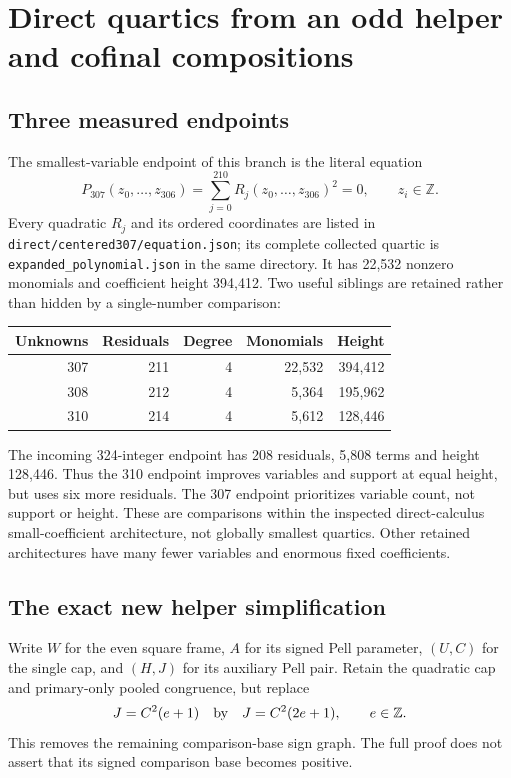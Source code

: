 \section{Direct quartics from an odd helper and cofinal compositions}
\label{sec:round17-direct}

\subsection{Three measured endpoints}
The smallest-variable endpoint of this branch is the literal equation
\[
 P_{307}(z_0,\ldots,z_{306})
   =\sum_{j=0}^{210}R_j(z_0,\ldots,z_{306})^2=0,
 \qquad z_i\in\mathbb Z.
\]
Every quadratic $R_j$ and its ordered coordinates are listed in
\texttt{direct/centered307/equation.json}; its complete collected quartic is
\texttt{expanded\_polynomial.json} in the same directory. It has 22,532
nonzero monomials and coefficient height 394,412. Two useful siblings are
retained rather than hidden by a single-number comparison:
\begin{center}
\begin{tabular}{rrrrr}
\toprule
Unknowns & Residuals & Degree & Monomials & Height\\
\midrule
307 & 211 & 4 & 22,532 & 394,412\\
308 & 212 & 4 & 5,364 & 195,962\\
310 & 214 & 4 & 5,612 & 128,446\\
\bottomrule
\end{tabular}
\end{center}
The incoming 324-integer endpoint has 208 residuals, 5,808 terms and height
128,446. Thus the 310 endpoint improves variables and support at equal height,
but uses six more residuals. The 307 endpoint prioritizes variable count, not
support or height. These are comparisons within the inspected direct-calculus
small-coefficient architecture, not globally smallest quartics. Other retained
architectures have many fewer variables and enormous fixed coefficients.

\subsection{The exact new helper simplification}
Write $W$ for the even square frame, $A$ for its signed Pell parameter,
$(U,C)$ for the single cap, and $(H,J)$ for its auxiliary Pell pair. Retain
the quadratic cap and primary-only pooled congruence, but replace
\[
 J=C^2(e+1)\quad\hbox{by}\quad J=C^2(2e+1),\qquad e\in\mathbb Z.
\]
This removes the remaining comparison-base sign graph. The full proof does
not assert that its signed comparison base becomes positive.


